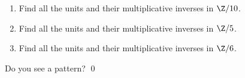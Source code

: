   \mbox{}
  \begin{enumerate}[nosep,label=\textnormal{(\alph*)}]
  \item Find all the units and their multiplicative inverses in $\Z/10$.
  \item Find all the units and their multiplicative inverses in $\Z/5$.
  \item Find all the units and their multiplicative inverses in $\Z/6$.
  \end{enumerate}
  Do you see a pattern?
  \qed
